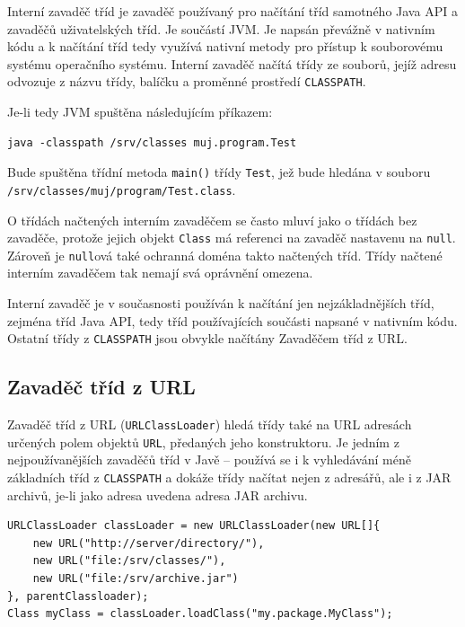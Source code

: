 Interní zavaděč tříd je zavaděč používaný pro načítání tříd samotného Java API a zavaděčů uživatelských tříd.
Je součástí JVM. Je napsán převážně v nativním kódu a k načítání tříd tedy využívá nativní metody pro přístup k souborovému systému operačního systému.
Interní zavaděč načítá třídy ze souborů, jejíž adresu odvozuje z názvu třídy, balíčku a proměnné prostředí {\tt CLASSPATH}. \cite[3.2.1]{oaks}

Je-li tedy JVM spuštěna následujícím příkazem:

\begin{lstlisting}[caption=Spuštění JVM s předefinovanou proměnnou {\tt CLASSPATH}, label=javaClasspath]
java -classpath /srv/classes muj.program.Test
\end{lstlisting}

Bude spuštěna třídní metoda {\tt main()} třídy {\tt Test}, jež bude hledána v souboru {\tt /srv/classes/muj/program/Test.class}.

O třídách načtených interním zavaděčem se často mluví jako o třídách bez zavaděče, protože jejich objekt {\tt Class} má referenci na zavaděč nastavenu na {\tt null}. \cite[3.2.1]{oaks} Zároveň je {\tt null}ová také ochranná doména takto načtených tříd. Třídy načtené interním zavaděčem tak nemají svá oprávnění omezena. \cite[5.4]{oaks}

Interní zavaděč je v současnosti používán k načítání jen nejzákladnějších tříd, zejména tříd Java API, tedy tříd používajících součásti napsané v nativním kódu. Ostatní třídy z {\tt CLASSPATH} jsou obvykle načítány Zavaděčem tříd z URL.

\subsection{Zavaděč tříd z URL} \label{URLClassLoader}

Zavaděč tříd z URL ({\tt URLClassLoader}) hledá třídy také na URL adresách určených polem objektů {\tt URL}, předaných jeho konstruktoru. Je jedním z nejpoužívanějších zavaděčů tříd v Javě -- používá se i k vyhledávání méně základních tříd z {\tt CLASSPATH} a dokáže třídy načítat nejen z adresářů, ale i z JAR archivů, je-li jako adresa uvedena adresa JAR archivu. \cite[3.2.5]{oaks}

\begin{lstlisting}[caption=Vytvoření vlastní instance zavaděče tříd z URL, label=urlclassloader]
URLClassLoader classLoader = new URLClassLoader(new URL[]{
    new URL("http://server/directory/"),
    new URL("file:/srv/classes/"),
    new URL("file:/srv/archive.jar")
}, parentClassloader);
Class myClass = classLoader.loadClass("my.package.MyClass");
\end{lstlisting}

